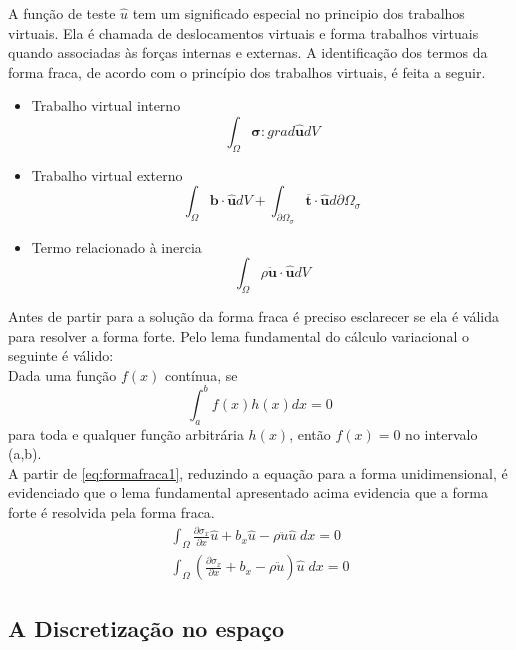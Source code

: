 A função de teste $ \hat{u} $ tem um significado especial no principio dos trabalhos virtuais. Ela é chamada de deslocamentos virtuais e forma trabalhos virtuais quando associadas às forças internas e externas. A identificação dos termos da forma fraca, de acordo com o princípio dos trabalhos virtuais, é feita a seguir.
\begin{itemize}
	\item Trabalho virtual interno
	\begin{equation}
		\int_{\Omega} \boldsymbol{\sigma} : grad\boldsymbol{\hat{u}} dV
	\end{equation}
	\item Trabalho virtual externo
	\begin{equation}
		\int_{\Omega} \boldsymbol{b} \cdot \boldsymbol{\hat{u}} dV + \int_{\partial \Omega_{\sigma}} \boldsymbol{\overline{t}} \cdot \boldsymbol{\hat{u}} d\partial \Omega_{\sigma}
	\end{equation}
	\item Termo relacionado à inercia
	\begin{equation}
		\int_{\Omega} \rho \ddot{\boldsymbol{u}} \cdot \boldsymbol{\hat{u}}  dV
	\end{equation}
\end{itemize}

Antes de partir para a solução da forma fraca é preciso esclarecer se ela é válida para resolver a forma forte. Pelo lema fundamental do cálculo variacional o seguinte é válido:\\
Dada uma função $ f(x) $ contínua, se
\begin{equation}
\int_{a}^{b} f(x) h(x) dx = 0
\end{equation}
para toda e qualquer função arbitrária $ h(x) $,
então $ f(x) = 0 $ no intervalo (a,b). \\

A partir de \ref{eq:formafraca1}, reduzindo a equação para a forma unidimensional, é evidenciado que o lema fundamental apresentado acima evidencia que a forma forte é resolvida pela forma fraca.
\begin{align}
	\int_{\Omega} \frac{\partial \sigma_x}{\partial x} \hat{u} + b_x \hat{u} - \rho\ddot{u} \hat{u} \; dx = 0 \\
	\int_{\Omega} (\frac{\partial \sigma_x}{\partial x}  + b_x - \rho\ddot{u} )\hat{u} \; dx = 0
\end{align}

\subsection{A Discretização no espaço}

